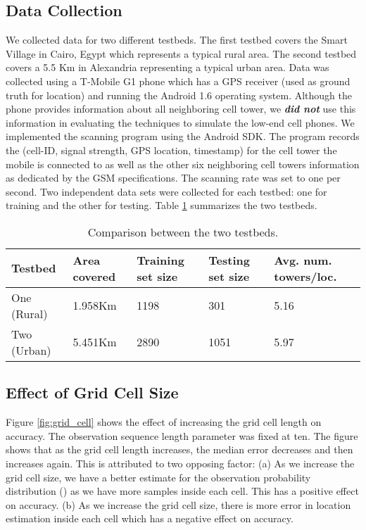 \documentclass[conference]{IEEEtran}
\begin{document}
\subsection{Data Collection}
We collected data for two different testbeds. The first testbed
covers the Smart Village in Cairo, Egypt which represents a typical
rural area. The second testbed covers a 5.5 Km in Alexandria
representing a typical urban area. Data was collected using a
T-Mobile G1 phone which has a GPS receiver (used as ground truth for
location) and running the Android 1.6 operating system. Although the
phone provides information about all neighboring cell tower, we
\emph{\textbf{did not }}use this information in evaluating
the techniques to simulate the low-end cell phones.
We implemented the scanning program using the Android SDK. The
program records the (cell-ID, signal strength, GPS location,
timestamp) for the cell tower the mobile is connected to as well as
the other six neighboring cell towers information as dedicated by
the GSM specifications. The scanning rate was set to one per second.
Two independent data sets were collected for each testbed: one for
training and the other for testing. Table \ref{testbeds} summarizes
the two testbeds.

\begin{table}
\centering
\begin{tabular}{|p{0.42in}||p{0.45in}|p{0.55in}|p{0.55in}|p{0.6in}|}
\hline

Testbed & Area covered & Training set size & Testing set size& Avg. num. towers/loc.\\
\hline
 One (Rural)& 1.958Km & 1198 & 301 &  5.16\\
\hline
Two (Urban)& 5.451Km & 2890 & 1051 & 5.97\\
\hline


\end{tabular}
\caption{Comparison between the two testbeds.} \label{testbeds}
\end{table}

\subsection{Effect of Grid Cell Size}
Figure \ref{fig:grid_cell} shows the effect of increasing the grid
cell length on accuracy. The observation sequence length parameter
was fixed at ten. The figure shows that as the grid cell length
increases, the median error decreases and then increases again. This
is attributed to two opposing factor: (a) As we increase the grid
cell size, we have a better estimate for the observation probability
distribution () as we have more samples inside each cell. This
has a positive effect on accuracy. (b) As we increase the grid cell
size, there is more error in location estimation inside each cell
which has a negative effect on accuracy.
\end{document}
